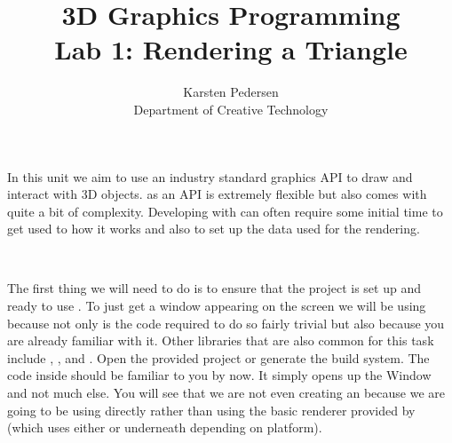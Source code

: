 \documentclass[10pt]{article}
\begin{document}
\title{3D Graphics Programming \\
  \large Lab 1: Rendering a Triangle}

\author{Karsten Pedersen\\ Department of Creative Technology}
\maketitle

In this unit we aim to use an industry standard graphics API to draw
and interact with 3D objects.  as an API is extremely flexible
but also comes with quite a bit of complexity.  Developing with 
can often require some initial time to get used to how it works and also
to set up the data used for the rendering.

\

The first thing we will need to do is to ensure that the project is
set up and ready to use . To just get a window appearing
on the screen we will be using  because not only is the code
required to do so fairly trivial but also because you are already familiar
with it.  Other libraries that are also common for this task include
, ,  and . Open
the provided  project or generate
the  build system.  The code inside 
should be familiar to you by now. It simply opens up the 
Window and not much else.  You will see that we are not even creating an
 because we are going to be using 
directly rather than using the basic renderer provided by 
(which uses either  or  underneath depending
on platform).

\end{document}
